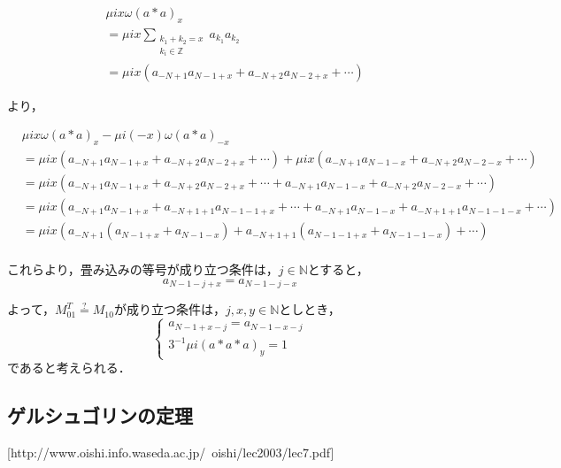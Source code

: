 \documentclass[11pt,a4paper]{jsarticle}
\theoremstyle{definition}
\begin{document}
\begin{equation}
  \begin{split}
    &\mu i x \omega (a*a)_{x}\\
    &= \mu ix \sum_{\substack{k_1+k_2=x \\ k_i\in\mathbb{Z}}} a_{k_1}a_{k_2}\\
    &= \mu ix (a_{-N+1}a_{N-1+x}+a_{-N+2}a_{N-2+x}+\cdots)
  \end{split}
\end{equation}

より，

\begin{equation}
  \begin{split}
    &\mu i x \omega (a*a)_{x} - \mu i (-x) \omega (a*a)_{-x} \\
    &= \mu ix (a_{-N+1}a_{N-1+x}+a_{-N+2}a_{N-2+x}+\cdots) + \mu ix (a_{-N+1}a_{N-1-x}+a_{-N+2}a_{N-2-x}+\cdots)\\
    &= \mu ix (a_{-N+1}a_{N-1+x}+a_{-N+2}a_{N-2+x}+\cdots + a_{-N+1}a_{N-1-x}+a_{-N+2}a_{N-2-x}+\cdots)\\
    &= \mu ix (a_{-N+1}a_{N-1+x}+a_{-N+1+1}a_{N-1-1+x}+\cdots + a_{-N+1}a_{N-1-x}+a_{-N+1+1}a_{N-1-1-x}+\cdots)\\
    &= \mu ix (a_{-N+1}(a_{N-1+x}+a_{N-1-x})+a_{-N+1+1}(a_{N-1-1+x}+a_{N-1-1-x})+\cdots )\\
  \end{split}
\end{equation}

これらより，畳み込みの等号が成り立つ条件は，$j\in \mathbb{N}$とすると，
\begin{equation}
  a_{N-1-j+x} = a_{N-1-j-x}
\end{equation}

よって，$M_{01}^T \stackrel{\mathrm{?}}{=} M_{10}$が成り立つ条件は，$j,x,y\in \mathbb{N}$としとき，
\begin{equation}
  \begin{cases}
    a_{N-1+x-j} = a_{N-1-x-j}\\
    3^{-1}\mu i (a*a*a)_y = 1
  \end{cases}
\end{equation}
であると考えられる．


\subsection*{ゲルシュゴリンの定理}
[http://www.oishi.info.waseda.ac.jp/~oishi/lec2003/lec7.pdf] \\
\end{document}

